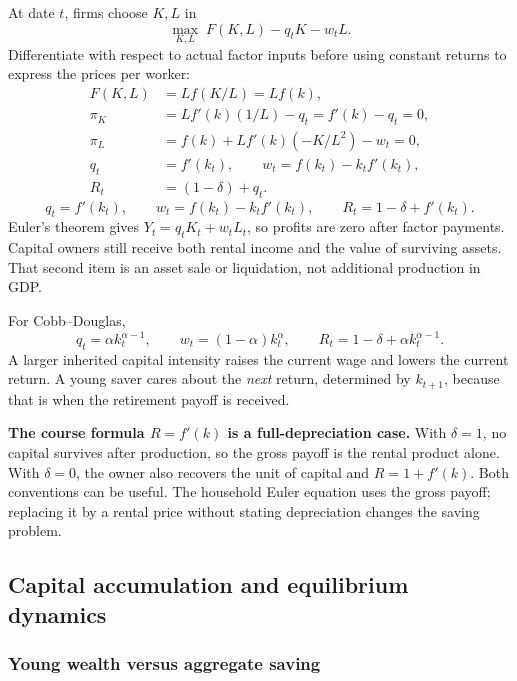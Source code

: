 At date $t$, firms choose $K,L$ in
\begin{equation}
\max_{K,L}\;F(K,L)-q_tK-w_tL.
\end{equation}
Differentiate with respect to actual factor inputs before using constant
returns to express the prices per worker:
\begin{align}
F(K,L)&=Lf(K/L)=Lf(k),\\
\pi_K&=Lf'(k)(1/L)-q_t=f'(k)-q_t=0,\\
\pi_L&=f(k)+Lf'(k)(-K/L^2)-w_t=0,\\
q_t&=f'(k_t),\qquad w_t=f(k_t)-k_tf'(k_t),\\
R_t&=(1-\delta)+q_t.
\end{align}
\begin{equation}\label{eq:olg-prices}
q_t=f'(k_t),\qquad
w_t=f(k_t)-k_tf'(k_t),\qquad
R_t=1-\delta+f'(k_t).
\end{equation}
Euler's theorem gives $Y_t=q_tK_t+w_tL_t$, so profits are zero after factor
payments. Capital owners still receive both rental income and the value of
surviving assets. That second item is an asset sale or liquidation, not
additional production in GDP.

For Cobb--Douglas,
\begin{equation}
q_t=\alpha k_t^{\alpha-1},\qquad
w_t=(1-\alpha)k_t^\alpha,\qquad
R_t=1-\delta+\alpha k_t^{\alpha-1}.
\end{equation}
A larger inherited capital intensity raises the current wage and lowers the
current return. A young saver cares about the \emph{next} return, determined
by $k_{t+1}$, because that is when the retirement payoff is received.

\begin{blueblock}
\textbf{The course formula $R=f'(k)$ is a full-depreciation case.}
With $\delta=1$, no capital survives after production, so the gross payoff
is the rental product alone. With $\delta=0$, the owner also recovers the
unit of capital and $R=1+f'(k)$. Both conventions can be useful. The
household Euler equation uses the gross payoff; replacing it by a rental
price without stating depreciation changes the saving problem.
\end{blueblock}

\subsection{Capital accumulation and equilibrium dynamics}

\subsubsection{Young wealth versus aggregate saving}

